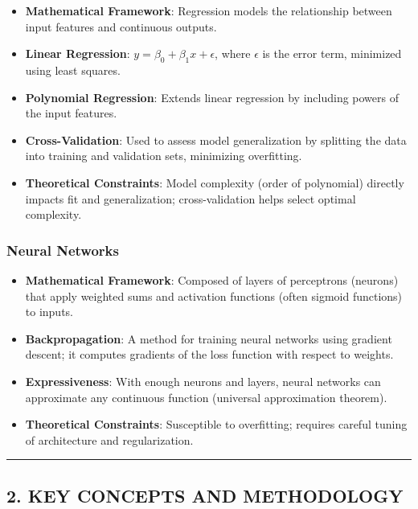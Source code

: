 \documentclass[
  12pt,
]{report}
\providecommand{\tightlist}{%
  \setlength{\itemsep}{0pt}\setlength{\parskip}{0pt}}
\begin{document}
\begin{itemize}
\tightlist
\item
  \textbf{Mathematical Framework}: Regression models the relationship between input features and continuous outputs.
\item
  \textbf{Linear Regression}: \(y = \beta_0 + \beta_1 x + \epsilon\), where \(\epsilon\) is the error term, minimized using least squares.
\item
  \textbf{Polynomial Regression}: Extends linear regression by including powers of the input features.
\item
  \textbf{Cross-Validation}: Used to assess model generalization by splitting the data into training and validation sets, minimizing overfitting.
\item
  \textbf{Theoretical Constraints}: Model complexity (order of polynomial) directly impacts fit and generalization; cross-validation helps select optimal complexity.
\end{itemize}

\subsubsection{Neural Networks}\label{neural-networks}

\begin{itemize}
\tightlist
\item
  \textbf{Mathematical Framework}: Composed of layers of perceptrons (neurons) that apply weighted sums and activation functions (often sigmoid functions) to inputs.
\item
  \textbf{Backpropagation}: A method for training neural networks using gradient descent; it computes gradients of the loss function with respect to weights.
\item
  \textbf{Expressiveness}: With enough neurons and layers, neural networks can approximate any continuous function (universal approximation theorem).
\item
  \textbf{Theoretical Constraints}: Susceptible to overfitting; requires careful tuning of architecture and regularization.
\end{itemize}

\begin{center}\rule{0.5\linewidth}{0.5pt}\end{center}

\subsection{2. KEY CONCEPTS AND METHODOLOGY}\label{key-concepts-and-methodology}
\end{document}
